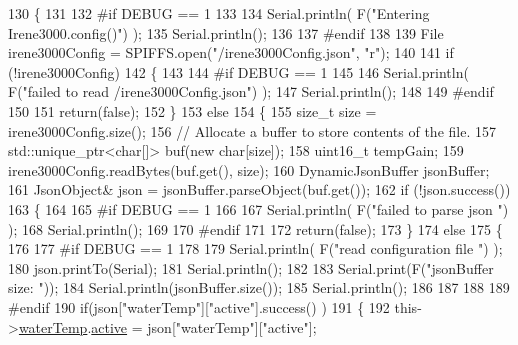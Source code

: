 \begin{DoxyCode}
130 \{
131 
132 \textcolor{preprocessor}{#if DEBUG == 1 }
133 
134     Serial.println( F(\textcolor{stringliteral}{"Entering Irene3000.config()"}) );
135     Serial.println();
136 
137 \textcolor{preprocessor}{#endif}
138 
139     File irene3000Config = SPIFFS.open(\textcolor{stringliteral}{"/irene3000Config.json"}, \textcolor{stringliteral}{"r"});
140 
141     \textcolor{keywordflow}{if} (!irene3000Config) 
142     \{
143     
144 \textcolor{preprocessor}{    #if DEBUG == 1 }
145 
146         Serial.println( F(\textcolor{stringliteral}{"failed to read /irene3000Config.json"}) );
147         Serial.println();
148     
149 \textcolor{preprocessor}{    #endif}
150 
151         \textcolor{keywordflow}{return}(\textcolor{keyword}{false});
152     \}
153     \textcolor{keywordflow}{else}
154     \{
155         \textcolor{keywordtype}{size\_t} size = irene3000Config.size();
156         \textcolor{comment}{// Allocate a buffer to store contents of the file.}
157         std::unique\_ptr<char[]> buf(\textcolor{keyword}{new} \textcolor{keywordtype}{char}[size]);
158             uint16\_t tempGain;
159         irene3000Config.readBytes(buf.get(), size);
160         DynamicJsonBuffer jsonBuffer;
161         JsonObject& json = jsonBuffer.parseObject(buf.get());
162         \textcolor{keywordflow}{if} (!json.success()) 
163         \{
164         
165 \textcolor{preprocessor}{        #if DEBUG == 1 }
166 
167             Serial.println( F(\textcolor{stringliteral}{"failed to parse json "}) );
168             Serial.println();
169         
170 \textcolor{preprocessor}{        #endif}
171             
172             \textcolor{keywordflow}{return}(\textcolor{keyword}{false});
173         \} 
174         \textcolor{keywordflow}{else}
175         \{
176         
177 \textcolor{preprocessor}{        #if DEBUG == 1 }
178     
179             Serial.println( F(\textcolor{stringliteral}{"read configuration file "}) );
180             json.printTo(Serial);
181             Serial.println();
182 
183             Serial.print(F(\textcolor{stringliteral}{"jsonBuffer size: "}));
184             Serial.println(jsonBuffer.size());
185             Serial.println();
186 
187         
188 
189 \textcolor{preprocessor}{        #endif          }
190             \textcolor{keywordflow}{if}(json[\textcolor{stringliteral}{"waterTemp"}][\textcolor{stringliteral}{"active"}].success() )
191             \{           
192                 this->\hyperlink{classIrene3000_af05612c78c758ce9db316c75ad937130}{waterTemp}.\hyperlink{structIrene3000_1_1state_af7ff649f20b9a2fb6ca0f949ee9a25ce}{active} = json[\textcolor{stringliteral}{"waterTemp"}][\textcolor{stringliteral}{"active"}]; 

\end{DoxyCode}

